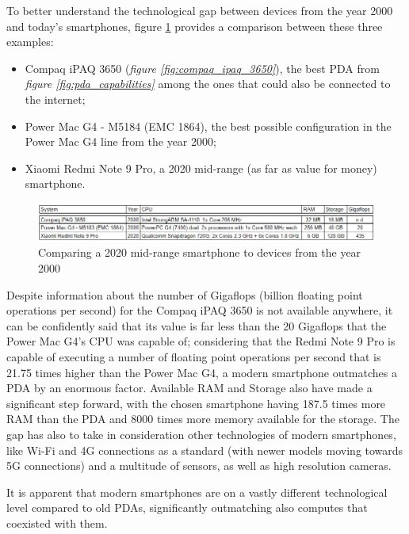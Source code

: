 To better understand the technological gap between devices from the year 2000 and today's smartphones, {figure \ref{fig:three_systems_comparison}} provides a comparison between these three examples:
\begin{itemize}
    \item Compaq iPAQ 3650 (\textit{figure \ref{fig:compaq_ipaq_3650}}), the best PDA from \textit{figure \ref{fig:pda_capabilities}} among the ones that could also be connected to the internet;
    \item Power Mac G4 - M5184 (EMC 1864), the best possible configuration in the Power Mac G4 line from the year 2000;
    \item Xiaomi Redmi Note 9 Pro, a 2020 mid-range (as far as value for money) smartphone.
\end{itemize}
\vspace*{20mm}

\begin{figure}[!ht]
    \centering
    \includegraphics[scale=0.88]{document/chapters/chapter_1/images/three_systems_comparison.png}
    \caption{Comparing a 2020 mid-range smartphone to devices from the year 2000}
    \label{fig:three_systems_comparison}
\end{figure}

Despite information about the number of Gigaflops (billion floating point operations per second) for the Compaq iPAQ 3650 is not available anywhere, it can be confidently said that its value is far less than the 20 Gigaflops that the Power Mac G4's CPU was capable of; considering that the Redmi Note 9 Pro is capable of executing a number of floating point operations per second that is 21.75 times higher than the Power Mac G4, a modern smartphone outmatches a PDA by an enormous factor. Available RAM and Storage also have made a significant step forward, with the chosen smartphone having 187.5 times more RAM than the PDA and 8000 times more memory available for the storage. The gap has also to take in consideration other technologies of modern smartphones, like Wi-Fi and 4G connections as a standard (with newer models moving towards 5G connections) and a multitude of sensors, as well as high resolution cameras. 

It is apparent that modern smartphones are on a vastly different technological level compared to old PDAs, significantly outmatching also computes that coexisted with them.
